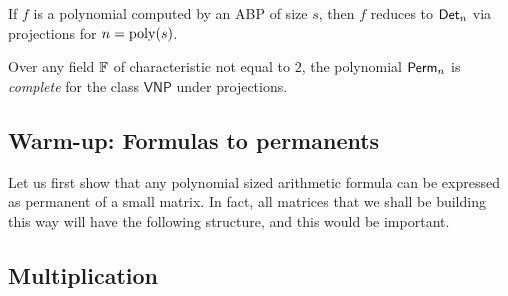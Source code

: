 \begin{theorem}[\cite{v79}]\label{thm:vp}
If $f$ is a polynomial computed by an ABP of size $s$, then $f$ reduces to $\operatorname{\mathsf{Det}}_n$ via projections for $n = \operatorname{poly}(s)$. 
\end{theorem}
\begin{theorem}[\cite{v79}]\label{thm:vnp}
Over any field $\mathbb{F}$ of characteristic not equal to $2$, the polynomial $\operatorname{\mathsf{Perm}}_n$ is \emph{complete} for the class $\mathsf{VNP}$ under projections.
\end{theorem}

\subsection{Warm-up: Formulas to permanents}\label{sec:formula-to-dets}

Let us first show that any polynomial sized arithmetic formula can be expressed as permanent of a small matrix.
In fact, all matrices that we shall be building this way will have the following structure, and this would be important.\\

\begin{center}
\end{center}

\subsection*{Multiplication}

